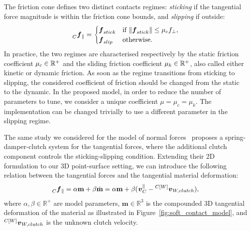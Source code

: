 The friction cone defines two distinct contacts regimes: \emph{sticking} if the tangential force magnitude is within the friction cone bounds, and \emph{slipping} if outside:
%
\begin{equation*}
    \forcelin[C]_\parallel = 
    \begin{cases}
        \boldsymbol{f}_{stick} & \text{if $\norm{\boldsymbol{f}_{stick}} \leq \mu_c f_\perp$,} \\
        \boldsymbol{f}_{slip} & \text{otherwise.}
    \end{cases}
\end{equation*}
%
In practice, the two regimes are characterised respectively by the static friction coefficient $\mu_c \in \realn^+$ and the sliding friction coefficient $\mu_k \in \realn^+$, also called either kinetic or dynamic friction.
As soon as the regime transitions from sticking to slipping, the considered coefficient of friction should be changed from the static to the dynamic.
In the proposed model, in order to reduce the number of parameters to tune, we consider a unique coefficient $\mu = \mu_c = \mu_k$.
The implementation can be changed trivially to use a different parameter in the slipping regime.

The same study we considered for the model of normal forces~\parencite{azad_modeling_2010} proposes a spring-damper-clutch system for the tangential forces, where the additional clutch component controls the sticking-slipping condition.
Extending their 2D formulation to our 3D point-surface setting, we can introduce the following relation between the tangential forces and the tangential material deformation:
%
\begin{equation}
    \label{equation:tangential_contact_model}
    \forcelin[C]_\parallel
    = \alpha \mathbf{m} + \beta \dot{\mathbf{m}}
    = \alpha \mathbf{m} + \beta (\vellin_C^\parallel - \vellin[{C[W]}]_{W,clutch})
    ,
\end{equation}
%
where $\alpha, \beta \in \mathbb{R}^+$ are model parameters, $\mathbf{m} \in \mathbb{R}^3$ is the compounded 3D tangential deformation of the material as illustrated in Figure~\ref{fig:soft_contact_model}, and $\vellin[{C[W]}]_{W,clutch}$ is the unknown clutch velocity.

